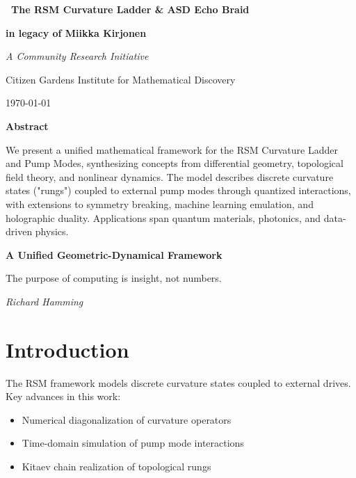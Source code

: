 \documentclass[12pt]{article}
\theoremstyle{plain}
\begin{document}
\begin{titlepage}
    \centering
    \vspace*{3cm}

    {\Huge\bfseries\ {The RSM Curvature Ladder \& ASD Echo Braid\\
} 
 \par}
    \vspace{0.5cm}
    {\LARGE\bfseries in legacy of Miikka Kirjonen\par}

    \vspace{2cm}
    {\Large\itshape A Community Research Initiative \par}
    \vspace{0.5cm}
    {\normalsize Citizen Gardens Institute for Mathematical Discovery \par}
    {\normalsize \today \par}

    \vfill

    {\bfseries Abstract \par}
    \vspace{0.5em}
    \begin{minipage}{0.85\textwidth}
        \small
  We present a unified mathematical framework for the RSM Curvature Ladder and Pump Modes, synthesizing concepts from differential geometry, topological field theory, and nonlinear dynamics. The model describes discrete curvature states ("rungs") coupled to external pump modes through quantized interactions, with extensions to symmetry breaking, machine learning emulation, and holographic duality. Applications span quantum materials, photonics, and data-driven physics.

    \end{minipage}

\end{titlepage}


\clearpage
\clearpage
\thispagestyle{empty}
\begin{center}
    \Large\textbf{A Unified Geometric-Dynamical Framework }
\end{center}

\vspace{2em}

\epigraph{The purpose of computing is insight, not numbers.}{\textit{Richard Hamming}}

\vspace{1em}


\section{Introduction}
The RSM framework models discrete curvature states coupled to external drives. Key advances in this work:
\begin{itemize}
    \item Numerical diagonalization of curvature operators
    \item Time-domain simulation of pump mode interactions
    \item Kitaev chain realization of topological rungs
\end{itemize}
\end{document}
